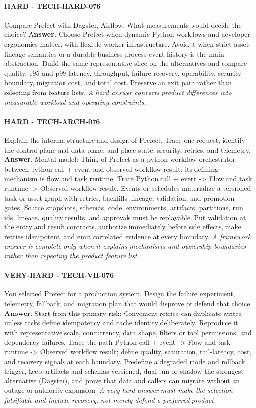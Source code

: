 \paragraph{HARD - TECH-HARD-076} Compare Prefect with Dagster, Airflow. What measurements would decide the choice?
\textbf{Answer.} Choose Prefect when dynamic Python workflows and developer ergonomics matter, with flexible worker infrastructure. Avoid it when strict asset lineage semantics or a durable business-process event history is the main abstraction. Build the same representative slice on the alternatives and compare quality, p95 and p99 latency, throughput, failure recovery, operability, security boundary, migration cost, and total cost. Preserve an exit path rather than selecting from feature lists.
\textit{A hard answer converts product differences into measurable workload and operating constraints.}
\paragraph{HARD - TECH-ARCH-076} Explain the internal structure and design of Prefect. Trace one request, identify the control plane and data plane, and place state, security, retries, and telemetry.
\textbf{Answer.} Mental model: Think of Prefect as a python workflow orchestrator between python call + event and observed workflow result; its defining mechanism is flow and task runtime. Trace Python call + event -> Flow and task runtime -> Observed workflow result. Events or schedules materialize a versioned task or asset graph with retries, backfills, lineage, validation, and promotion gates. Source snapshots, schemas, code, environments, artifacts, partitions, run ids, lineage, quality results, and approvals must be replayable. Put validation at the entry and result contracts, authorize immediately before side effects, make retries idempotent, and emit correlated evidence at every boundary.
\textit{A framework answer is complete only when it explains mechanisms and ownership boundaries rather than repeating the product feature list.}
\paragraph{VERY-HARD - TECH-VH-076} You selected Prefect for a production system. Design the failure experiment, telemetry, fallback, and migration plan that would disprove or defend that choice.
\textbf{Answer.} Start from this primary risk: Convenient retries can duplicate writes unless tasks define idempotency and cache identity deliberately. Reproduce it with representative scale, concurrency, data shape, filters or tool permissions, and dependency failures. Trace the path Python call + event -> Flow and task runtime -> Observed workflow result; define quality, saturation, tail-latency, cost, and recovery signals at each boundary. Predefine a degraded mode and rollback trigger, keep artifacts and schemas versioned, dual-run or shadow the strongest alternative (Dagster), and prove that data and callers can migrate without an outage or authority expansion.
\textit{A very-hard answer must make the selection falsifiable and include recovery, not merely defend a preferred product.}
